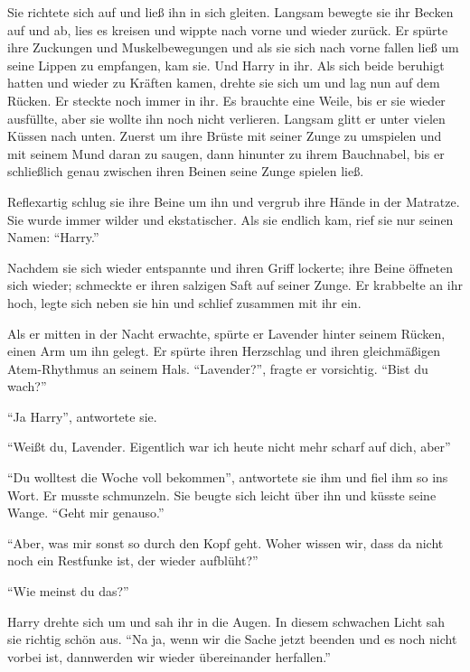 \begin{abAchtzehn}
Sie richtete sich auf und ließ ihn in sich gleiten. Langsam bewegte sie ihr Becken auf und ab, lies es kreisen und wippte nach vorne und wieder zurück. Er spürte ihre Zuckungen und Muskelbewegungen und als sie sich nach vorne fallen ließ um seine Lippen zu empfangen, kam sie. Und Harry in ihr. Als sich beide beruhigt hatten und wieder zu Kräften kamen, drehte sie sich um und lag nun auf dem Rücken. Er steckte noch immer in ihr. Es brauchte eine Weile, bis er sie wieder ausfüllte, aber sie wollte ihn noch nicht verlieren. Langsam glitt er unter vielen Küssen nach unten. Zuerst um ihre Brüste mit seiner Zunge zu umspielen und mit seinem Mund daran zu saugen, dann hinunter zu ihrem Bauchnabel, bis er schließlich genau zwischen ihren Beinen seine Zunge spielen ließ.

Reflexartig schlug sie ihre Beine um ihn und vergrub ihre Hände in der Matratze. Sie wurde immer wilder und ekstatischer. Als sie endlich kam, rief sie nur seinen Namen: \enquote{Harry.}

Nachdem sie sich wieder entspannte und ihren Griff lockerte; ihre Beine öffneten sich wieder; schmeckte er ihren salzigen Saft auf seiner Zunge. Er krabbelte an ihr hoch, legte sich neben sie hin und schlief zusammen mit ihr ein.

Als er mitten in der Nacht erwachte, spürte er Lavender hinter seinem Rücken, einen Arm um ihn gelegt. Er spürte ihren Herzschlag und ihren gleichmäßigen Atem-Rhythmus an seinem Hals. \enquote{Lavender?}, fragte er vorsichtig. \enquote{Bist du wach?}

\enquote{Ja Harry}, antwortete sie.

\enquote{Weißt du, Lavender. Eigentlich war ich heute nicht mehr scharf auf dich, aber\abs}

\enquote{Du wolltest die Woche voll bekommen}, antwortete sie ihm und fiel ihm so ins Wort. Er musste schmunzeln. Sie beugte sich leicht über ihn und küsste seine Wange. \enquote{Geht mir genauso.}

\enquote{Aber, was mir sonst so durch den Kopf geht. Woher wissen wir, dass da nicht noch ein Restfunke ist, der wieder aufblüht?}

\enquote{Wie meinst du das?}

Harry drehte sich um und sah ihr in die Augen. In diesem schwachen Licht sah sie richtig schön aus. \enquote{Na ja, wenn wir die Sache jetzt beenden und es noch nicht vorbei ist, dann\abs werden wir wieder übereinander herfallen.}


\end{abAchtzehn}
